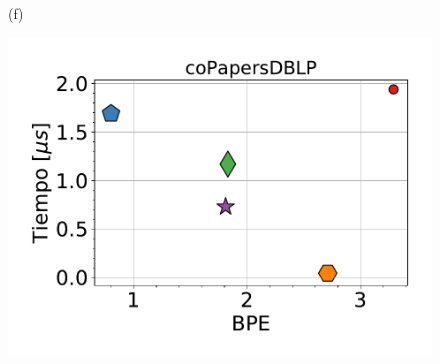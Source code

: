 \begin{figure}
\begin{minipage}{1\textwidth}
\begin{minipage}{0.45\textwidth}
    			(f)
    		\end{minipage}  
    	\end{minipage}
    	
        \begin{minipage}{1\textwidth}
    		\centering
    		\begin{minipage}{0.45\textwidth}
    			\centering
    			\begin{minipage}{0.75\textwidth}
    				\centering
    				\includegraphics[width=1\linewidth]{img/bpeTimes/aleatorio/coPapersDBLP.pdf}
    			\end{minipage}
    			\begin{minipage}{0.2\textwidth}
    				\centering

\end{minipage}
\end{minipage}
\end{minipage}
\end{figure}
